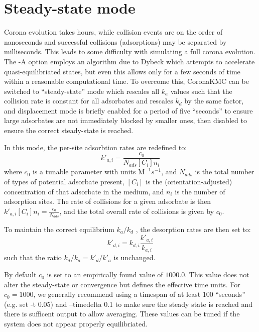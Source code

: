 \documentclass[10pt,a4paper,onecolumn]{report}
\begin{document}
\section{Steady-state mode} \label{section:coronaSteadyState}
Corona evolution takes hours, while collision events are on the order of nanoseconds and successful collisions (adsorptions) may be separated by milliseconds. This leads to some difficulty with simulating a full corona evolution. The -A option employs an algorithm due to Dybeck which attempts to accelerate quasi-equilibriated states, but even this allows only for a few seconds of time within a reasonable computational time. 
To overcome this, CoronaKMC can be switched to ``steady-state'' mode which rescales all $k_a$ values such that the collision rate is constant for all adsorbates and rescales $k_d$ by the same factor, and displacement mode is briefly enabled for a period of five ``seconds'' to ensure large adsorbates are not immediately blocked by smaller ones, then disabled to ensure the correct steady-state is reached.

In this mode, the per-site adsorbtion rates are redefined to:
\begin{equation}
k'_{a,i} = \frac{c_0}{N_{ads} [C_i] n_{i} }
\end{equation}
where  $c_0$ is a tunable parameter with units $\mathrm{M}^{-1} s^{-1}$, and $N_{ads}$ is the total number of types of potential adsorbate present, $[C_i]$ is the (orientation-adjusted) concentration of that adsorbate in the medium, and $n_i$ is the number of adsorption sites. The rate of collisions for a given adsorbate is then $k'_{a,i} [C_i] n_i = \frac{c_0}{N_{ads}}$, and the total overall rate of collisions is given by $c_0$. 


To maintain the correct equilibrium $k_a/k_d$ , the desorption rates are then set to:
\begin{equation}
k'_{d,i} = k_{d,i} \frac{ k'_{a,i} }{ k_{a,i} } 
\end{equation}
such that the ratio $k_d/k_a = k'_d/k'_a$ is unchanged. 


By default $c_0$ is set to an empirically found value of $1000.0$. This value does not alter the steady-state or convergence but defines the effective time units. For $c_0 = 1000$, we generally recommend using a timespan of at least 100 ``seconds'' (e.g. set -t 0.05) and --timedelta 0.1 to make sure the steady state is reached and there is sufficent output to allow averaging. These values can be tuned if the system does not appear properly equilibriated.
\end{document}
